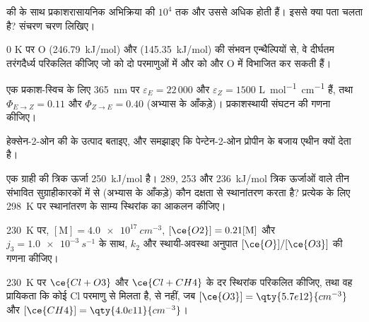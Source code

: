 \begin{exercise}[$\star$]\label{exo:b3:photochemistry:3}
 की  के साथ प्रकाशरासायनिक अभिक्रिया की  $10^4$ तक और
उससे अधिक होती हैं। इससे क्या पता चलता है? संचरण चरण लिखिए।
\end{exercise}

\begin{exercise}[$\star$]\label{exo:b3:photochemistry:4}
0 K पर O (\qty{246.79}{kJ/mol}) और 
(\qty{145.35}{kJ/mol}) की संभवन एन्थैल्पियों से, वे दीर्घतम तरंगदैर्ध्य परिकलित कीजिए जो  को दो
परमाणुओं में और  को  और O में विभाजित कर सकती हैं।
\end{exercise}

\begin{exercise}[$\star\star$]\label{exo:b3:photochemistry:5}
एक प्रकाश-स्विच के लिए \qty{365}{nm} पर $\varepsilon_E = 22\,000$ और $\varepsilon_Z = 1500$ \unit{L.mol^{-1}.cm^{-1}} हैं, तथा
$\Phi_{E\to Z} = 0.11$ और $\Phi_{Z\to E} = 0.40$ (अभ्यास के आँकड़े)। प्रकाशस्थायी
संघटन की गणना कीजिए।
\end{exercise}

\begin{exercise}[$\star\star$]\label{exo:b3:photochemistry:6}
हेक्सेन-2-ओन की  के उत्पाद बताइए, और समझाइए कि
पेन्टेन-2-ओन प्रोपीन के बजाय एथीन क्यों देता है।
\end{exercise}

\begin{exercise}[$\star\star$]\label{exo:b3:photochemistry:7}
एक ग्राही की त्रिक ऊर्जा \qty{250}{kJ/mol} है। 289, 253 और \qty{236}{kJ/mol} त्रिक ऊर्जाओं वाले
तीन संभावित सुग्राहीकारकों में से (अभ्यास के आँकड़े) कौन दक्षता से स्थानांतरण करता है? प्रत्येक के
लिए \qty{298}{K} पर स्थानांतरण के साम्य स्थिरांक का आकलन कीजिए।
\end{exercise}

\begin{exercise}[$\star\star$]\label{exo:b3:photochemistry:8}
\qty{230}{K} पर, $[\mathrm M] = \qty{4.0e17}{cm^{-3}}$, $[\ce{O2}] = 0.21[\mathrm M]$ और $j_3 = \qty{1.0e-3}{s^{-1}}$ के साथ,
$k_2$ और स्थायी-अवस्था अनुपात $[\ce{O}]/[\ce{O3}]$ की गणना कीजिए।
\end{exercise}

\begin{exercise}[$\star\star$]\label{exo:b3:photochemistry:9}
\qty{230}{K} पर $\ce{Cl + O3}$ और $\ce{Cl + CH4}$ के दर स्थिरांक परिकलित कीजिए, तथा
वह प्रायिकता कि कोई Cl परमाणु  से मिलता है,  से नहीं, जब $[\ce{O3}] = \qty{5.7e12}{cm^{-3}}$
और $[\ce{CH4}] = \qty{4.0e11}{cm^{-3}}$।
\end{exercise}

